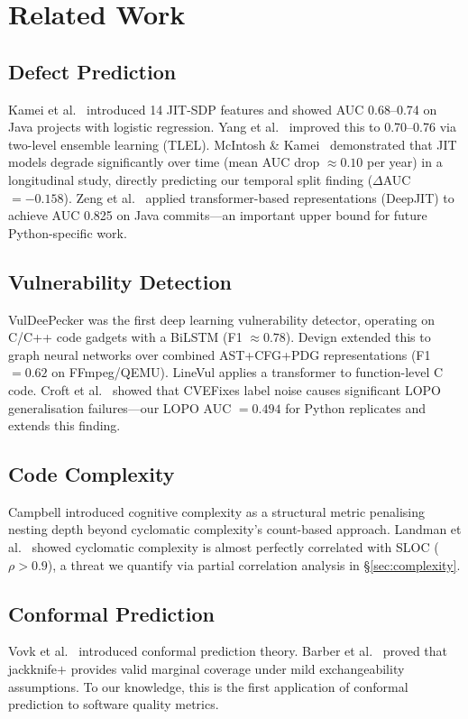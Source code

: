 \documentclass[conference]{IEEEtran}
\begin{document}
\section{Related Work}
\label{sec:related}

\subsection{Defect Prediction}
Kamei et al.~\cite{kamei2013} introduced 14 JIT-SDP features and showed
AUC 0.68--0.74 on Java projects with logistic regression.
Yang et al.~\cite{yang2016} improved this to 0.70--0.76 via two-level ensemble
learning (TLEL).
McIntosh \& Kamei~\cite{mcintosh2018} demonstrated that JIT models degrade
significantly over time (mean AUC drop $\approx 0.10$ per year) in a
longitudinal study, directly predicting our temporal split finding
($\Delta$AUC $= -0.158$).
Zeng et al.~\cite{zeng2021} applied transformer-based representations
(DeepJIT) to achieve AUC 0.825 on Java commits---an important upper bound
for future Python-specific work.

\subsection{Vulnerability Detection}
VulDeePecker \cite{li2018} was the first deep learning vulnerability detector,
operating on C/C++ code gadgets with a BiLSTM (F1 $\approx 0.78$).
Devign \cite{zhou2019} extended this to graph neural networks over combined
AST+CFG+PDG representations (F1 $= 0.62$ on FFmpeg/QEMU).
LineVul \cite{fu2022} applies a transformer to function-level C code.
Croft et al.~\cite{croft2023} showed that CVEFixes label noise causes
significant LOPO generalisation failures---our LOPO AUC $= 0.494$ for Python
replicates and extends this finding.

\subsection{Code Complexity}
Campbell \cite{campbell2018} introduced cognitive complexity as a structural
metric penalising nesting depth beyond cyclomatic complexity's count-based
approach.
Landman et al.~\cite{landman2016} showed cyclomatic complexity is almost
perfectly correlated with SLOC ($\rho > 0.9$), a threat we quantify via
partial correlation analysis in \S\ref{sec:complexity}.

\subsection{Conformal Prediction}
Vovk et al.~\cite{vovk2005} introduced conformal prediction theory.
Barber et al.~\cite{barber2021} proved that jackknife$+$ provides valid
marginal coverage under mild exchangeability assumptions.
To our knowledge, this is the first application of conformal prediction
to software quality metrics.
\end{document}
